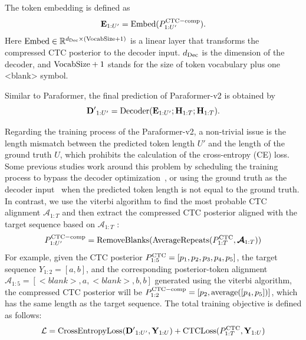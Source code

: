 \documentclass[runningheads]{llncs}
\begin{document}
The token embedding is defined as
\begin{equation}
{\bf E}_{1:U'} = {\rm Embed}(P^{\rm CTC-comp}_{1:U'} ).
\end{equation}
Here ${\rm Embed} \in  \mathbb{R}^{d_{\rm Dec} \times {\rm (VocabSize + 1)}} $ is a linear layer that transforms the compressed CTC posterior to the decoder input. $d_{\rm Dec}$ is the dimension of the decoder, and ${\rm VocabSize + 1}$ stands for the size of token vocabulary plus one <blank> symbol.

Similar to Paraformer, the final prediction of Paraformer-v2 is obtained by
\begin{equation}
{\bf D'}_{1:U'} = {\rm Decoder}({\bf E}_{1:U'}; {\bf H}_{1:T}; {\bf H}_{1:T}).
\end{equation}

Regarding the training process of the Paraformer-v2, a non-trivial issue is the length mismatch between the predicted token length $U'$ and the length of the ground truth  $U$, which prohibits the calculation of the cross-entropy (CE) loss. Some previous studies work around this problem by scheduling the training process to bypass the decoder optimization~\cite{spike}, or using the ground truth as the decoder input~\cite{ctc-nat} when the predicted token length is not equal to the ground truth. In contrast, we use the viterbi algorithm to find the most probable CTC alignment $\bm{\mathcal{A}}_{1:T}$ and then extract the compressed CTC posterior aligned with the target sequence based on $\bm{\mathcal{A}}_{1:T}$ :
\begin{equation}
P^{\rm CTC-comp}_{1:U'} = {\rm RemoveBlanks}({\rm AverageRepeats}(P^{\rm CTC}_{1:T}, \bm{\mathcal{A}}_{1:T}))
\end{equation}
For example, given the CTC posterior $P^{\rm CTC}_{1:5} = [p_1, p_2, p_3, p_4, p_5]$, the target sequence $Y_{1:2} = [a, b]$, and the corresponding posterior-token alignment $ \bm{\mathcal{A}}_{1:5} = [<blank>, a, <blank>, b, b]$ generated using the viterbi algorithm, the compressed CTC posterior will be $P^{\rm CTC-comp}_{1:2} = [p_2, {\rm average}([p_4, p_5])]$, which has the same length as the target sequence. The total training objective is defined as follows:
\begin{equation}
\mathcal{L} = {\rm CrossEntropyLoss}({\bf D'}_{1:U'}, {\bf Y}_{1:U}) +  {\rm CTCLoss}(P^{\rm CTC}_{1:T}, {\bf Y}_{1:U})
\end{equation}
\end{document}
